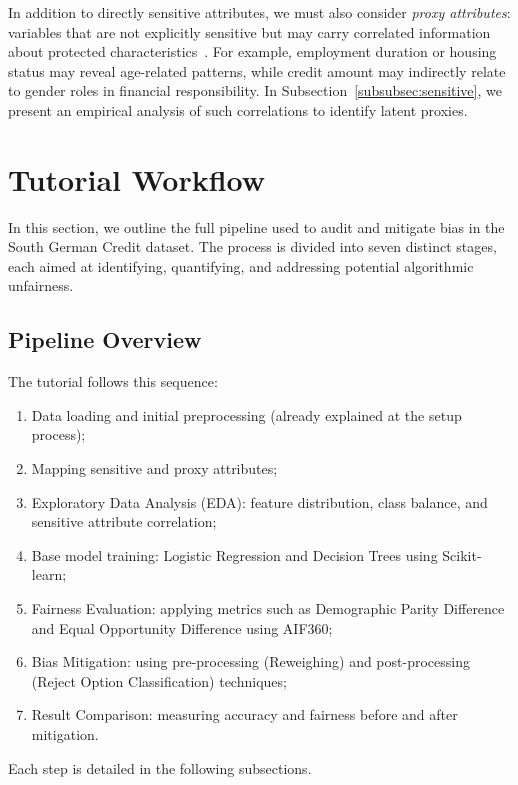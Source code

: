 In addition to directly sensitive attributes, we must also consider \textit{proxy attributes}: variables that are not explicitly sensitive but may carry correlated information about protected characteristics~\cite{pessach2020algorithmic}. For example, employment duration or housing status may reveal age-related patterns, while credit amount may indirectly relate to gender roles in financial responsibility. In Subsection~\ref{subsubsec:sensitive}, we present an empirical analysis of such correlations to identify latent proxies.

\section{Tutorial Workflow}

In this section, we outline the full pipeline used to audit and mitigate bias in the South German Credit dataset. The process is divided into seven distinct stages, each aimed at identifying, quantifying, and addressing potential algorithmic unfairness. 

\subsection{Pipeline Overview}
The tutorial follows this sequence:
\begin{enumerate}
    \item Data loading and initial preprocessing (already explained at the setup process);
    \item Mapping sensitive and proxy attributes;
    \item Exploratory Data Analysis (EDA): feature distribution, class balance, and sensitive attribute correlation;
    \item Base model training: Logistic Regression and Decision Trees using Scikit-learn;
    \item Fairness Evaluation: applying metrics such as Demographic Parity Difference and Equal Opportunity Difference using AIF360;
    \item Bias Mitigation: using pre-processing (Reweighing) and post-processing (Reject Option Classification) techniques;
    \item Result Comparison: measuring accuracy and fairness before and after mitigation.
\end{enumerate}

Each step is detailed in the following subsections.



